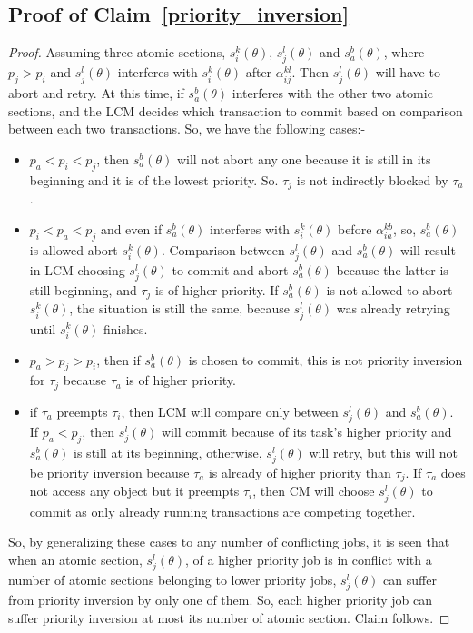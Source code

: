 \documentclass[letter]{sig-alternate}
\begin{document}
\subsection{\label{proof_priority_inversion} Proof of Claim~\ref{priority_inversion}}
\begin{proof}
Assuming three atomic sections, $s_i^k(\theta)$, $s_j^l(\theta)$ and $s_a^b(\theta)$, where $p_j > p_i$ and $s_j^l(\theta)$ interferes with $s_i^k(\theta)$ after $\alpha_{ij}^{kl}$. Then $s_j^l(\theta)$ will have to abort and retry. At this time, if $s_a^b(\theta)$ interferes with the other two atomic sections, and the LCM decides which transaction to commit based on comparison between each two transactions. So, we have the following cases:-
\begin{itemize}
\item $p_a < p_i < p_j$, then $s_a^b(\theta)$ will not abort any one because it is still in its beginning and it is of the lowest priority. So. $\tau_j$ is not indirectly blocked by $\tau_a$.
\item $p_i<p_a<p_j$ and even if $s_a^b(\theta)$ interferes with $s_i^k(\theta)$ before $\alpha_{ia}^{kb}$, so, $s_a^b(\theta)$ is allowed abort $s_i^k(\theta)$. Comparison between $s_j^l(\theta)$ and $s_a^b(\theta)$ will result in LCM choosing $s_j^l(\theta)$ to commit and abort $s_a^b(\theta)$ because the latter is still beginning, and $\tau_j$ is of higher priority. If $s_a^b(\theta)$ is not allowed to abort $s_i^k(\theta)$, the situation is still the same, because $s_j^l(\theta)$ was already retrying until $s_i^k(\theta)$ finishes.
\item $p_a>p_j>p_i$, then if $s_a^b(\theta)$ is chosen to commit, this is not priority inversion for $\tau_j$ because $\tau_a$ is of higher priority.
\item if $\tau_a$ preempts $\tau_i$, then LCM will compare only between $s_j^l(\theta)$ and $s_a^b(\theta)$. If $p_a<p_j$, then $s_j^l(\theta)$ will commit because of its task's higher priority and $s_a^b(\theta)$ is still at its beginning, otherwise, $s_j^l(\theta)$ will retry, but this will not be priority inversion because $\tau_a$ is already of higher priority than $\tau_j$. If $\tau_a$ does not access any object but it preempts $\tau_i$, then CM will choose $s_j^l(\theta)$ to commit as only already running transactions are competing together.
\end{itemize}
So, by generalizing these cases to any number of conflicting jobs, it is seen that when an atomic section, $s_j^l(\theta)$, of a higher priority job is in conflict with a number of atomic sections belonging to lower priority jobs, $s_j^l(\theta)$ can suffer from priority inversion by only one of them. So, each higher priority job can suffer priority inversion at most its number of atomic section. Claim follows.
\end{proof}
\end{document}
